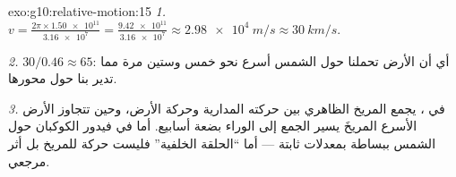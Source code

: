 \begin{solution}{exo:g10:relative-motion:15}
\emph{1.} $v = \frac{2\pi \times \num{1.50e11}}{\num{3.16e7}}
= \frac{\num{9.42e11}}{\num{3.16e7}} \approx \qty{2.98e4}{m/s}
\approx \qty{30}{km/s}$.

\emph{2.} $30 / 0.46 \approx 65$: أي أن الأرض تحملنا حول الشمس
أسرع نحو خمس وستين مرة مما تدير بنا حول محورها.

\emph{3.} في ، يجمع  المريخ الظاهري بين
حركته المدارية وحركة الأرض، وحين تتجاوز الأرض الأسرع
المريخَ يسير الجمع إلى الوراء بضعة أسابيع. أما في
 فيدور الكوكبان حول الشمس ببساطة بمعدلات ثابتة
--- أما ``الحلقة الخلفية'' فليست حركة للمريخ بل أثر
مرجعي.
\end{solution}

